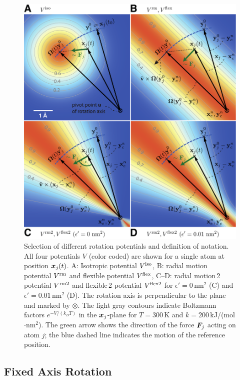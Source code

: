 \begin{figure}
\centerline{\includegraphics[width=13cm]{plots/equipotential.pdf}}
\caption{Selection of different rotation potentials and definition of notation.
All four potentials $V$ (color coded) are shown for a single atom at position
$\mbox{\boldmath ${x}$}_j(t)$.
{\sf A:} Isotropic potential $V^\mathrm{iso}$,
{\sf B:} radial motion potential $V^\mathrm{rm}$ and flexible potential
$V^\mathrm{flex}$,
{\sf C--D:} radial motion\,2 potential $V^\mathrm{rm2}$ and
flexible\,2 potential $V^\mathrm{flex2}$ for $\epsilon' = 0$\,nm$^2$ {\sf (C)}
and $\epsilon' = 0.01$\,nm$^2$ {\sf (D)}. The rotation axis is perpendicular to
the plane and marked by $\otimes$. The light gray contours indicate Boltzmann factors
$e^{-V/(k_B T)}$ in the $\mbox{\boldmath ${x}$}_j$-plane for $T=300$\,K and
$k=200$\,kJ/(mol$\cdot$nm$^2$). The green arrow shows the direction of the
force $\mbox{\boldmath ${F}$}_{\!j}$ acting on atom $j$; the blue dashed line indicates the
motion of the reference position.}
\label{fig:equipotential}
\end{figure}

\subsection{Fixed Axis Rotation}
